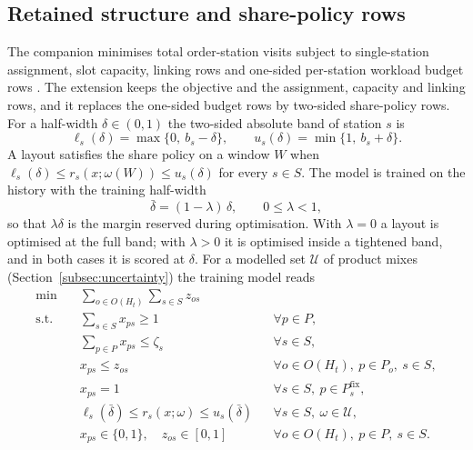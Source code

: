 \subsection{Retained structure and share-policy rows}\label{subsec:formulation}
The companion minimises total order-station visits subject to single-station assignment, slot capacity, linking rows and one-sided per-station workload budget rows \citep{belul_companion}. The extension keeps the objective and the assignment, capacity and linking rows, and it replaces the one-sided budget rows by two-sided share-policy rows. For a half-width $\delta\in(0,1)$ the two-sided absolute band of station $s$ is
\begin{equation}
\ell_s(\delta)=\max\{0,\ b_s-\delta\},\qquad u_s(\delta)=\min\{1,\ b_s+\delta\}. \label{eq:band}
\end{equation}
A layout satisfies the share policy on a window $W$ when $\ell_s(\delta)\le r_s(x;\omega(W))\le u_s(\delta)$ for every $s\in S$. The model is trained on the history with the training half-width
\begin{equation}
\bar\delta=(1-\lambda)\,\delta,\qquad 0\le\lambda<1, \label{eq:tight}
\end{equation}
so that $\lambda\delta$ is the margin reserved during optimisation. With $\lambda=0$ a layout is optimised at the full band; with $\lambda>0$ it is optimised inside a tightened band, and in both cases it is scored at $\delta$. For a modelled set $\mathcal U$ of product mixes (Section~\ref{subsec:uncertainty}) the training model reads
\begin{align}
\min\quad & \sum_{o\in O(H_t)}\sum_{s\in S} z_{os} \label{eq:obj}\\
\text{s.t.}\quad & \sum_{s\in S}x_{ps}\ge 1 && \forall p\in P, \label{eq:assign}\\
& \sum_{p\in P}x_{ps}\le\zeta_s && \forall s\in S, \label{eq:cap}\\
& x_{ps}\le z_{os} && \forall o\in O(H_t),\ p\in P_o,\ s\in S, \label{eq:link}\\
& x_{ps}=1 && \forall s\in S,\ p\in P^{\mathrm{fix}}_s, \label{eq:fix}\\
& \ell_s(\bar\delta)\le r_s(x;\omega)\le u_s(\bar\delta) && \forall s\in S,\ \omega\in\mathcal U, \label{eq:sharerow}\\
& x_{ps}\in\{0,1\},\quad z_{os}\in[0,1] && \forall o\in O(H_t),\ p\in P,\ s\in S. \label{eq:dom}
\end{align}
